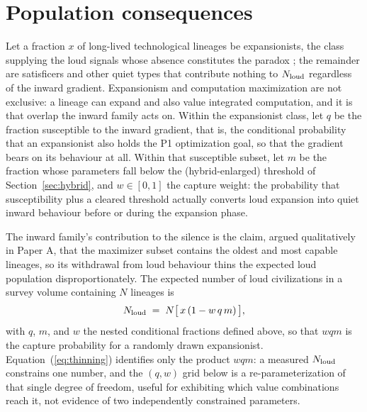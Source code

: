 \documentclass[11pt]{article}
\begin{document}
\section{Population consequences}
\label{sec:population}

Let a fraction $x$ of long-lived technological lineages be expansionists, the class supplying the loud signals whose absence constitutes the paradox \citep{Hanson2021,Olson2015}; the remainder are satisficers and other quiet types that contribute nothing to $N_{\rm loud}$ regardless of the inward gradient. Expansionism and computation maximization are not exclusive: a lineage can expand and also value integrated computation, and it is that overlap the inward family acts on. Within the expansionist class, let $q$ be the fraction susceptible to the inward gradient, that is, the conditional probability that an expansionist also holds the P1 optimization goal, so that the gradient bears on its behaviour at all. Within that susceptible subset, let $m$ be the fraction whose parameters fall below the (hybrid-enlarged) threshold of Section~\ref{sec:hybrid}, and $w \in [0,1]$ the capture weight: the probability that susceptibility plus a cleared threshold actually converts loud expansion into quiet inward behaviour before or during the expansion phase.

The inward family's contribution to the silence is the claim, argued qualitatively in Paper A, that the maximizer subset contains the oldest and most capable lineages, so its withdrawal from loud behaviour thins the expected loud population disproportionately. The expected number of loud civilizations in a survey volume containing $N$ lineages is
\begin{equation}
N_{\rm loud} \;=\; N\big[\,x\,(1 - w\,q\,m)\,\big],
\label{eq:thinning}
\end{equation}
with $q$, $m$, and $w$ the nested conditional fractions defined above, so that $w q m$ is the capture probability for a randomly drawn expansionist. Equation~(\ref{eq:thinning}) identifies only the product $wqm$: a measured $N_{\rm loud}$ constrains one number, and the $(q,w)$ grid below is a re-parameterization of that single degree of freedom, useful for exhibiting which value combinations reach it, not evidence of two independently constrained parameters.
\end{document}
